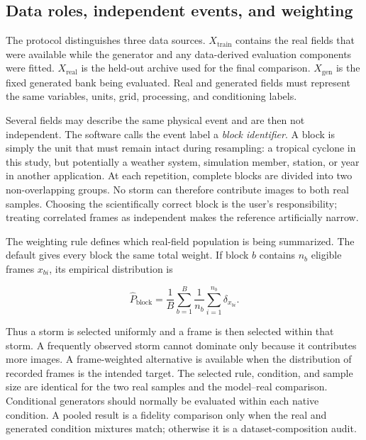 \documentclass[gmd, manuscript]{copernicus}
\begin{document}
\subsection{Data roles, independent events, and weighting}

The protocol distinguishes three data sources. \(X_{\mathrm{train}}\) contains the
real fields that were available while the generator and any data-derived evaluation
components were fitted. \(X_{\mathrm{real}}\) is the held-out archive used for the
final comparison. \(X_{\mathrm{gen}}\) is the fixed generated bank being evaluated.
Real and generated fields must represent the same variables, units, grid, processing,
and conditioning labels.

Several fields may describe the same physical event and are then not independent.
The software calls the event label a \emph{block identifier}. A block is simply the
unit that must remain intact during resampling: a tropical cyclone in this study, but
potentially a weather system, simulation member, station, or year in another
application. At each repetition, complete blocks are divided into two non-overlapping
groups. No storm can therefore contribute images to both real samples. Choosing the
scientifically correct block is the user's responsibility; treating correlated frames
as independent makes the reference artificially narrow.

The weighting rule defines which real-field population is being summarized. The
default gives every block the same total weight. If block \(b\) contains \(n_b\)
eligible frames \(x_{bi}\), its empirical distribution is

\begin{equation}
\widehat{P}_{\mathrm{block}} =
\frac{1}{B}\sum_{b=1}^{B}\frac{1}{n_b}\sum_{i=1}^{n_b}\delta_{x_{bi}} .
\label{eq:blockbalanced}
\end{equation}

Thus a storm is selected uniformly and a frame is then selected within that storm.
A frequently observed storm cannot dominate only because it contributes more
images. A frame-weighted alternative is available when the distribution of recorded
frames is the intended target. The selected rule, condition, and sample size are
identical for the two real samples and the model--real comparison. Conditional
generators should normally be evaluated within each native condition. A pooled result
is a fidelity comparison only when the real and generated condition mixtures match;
otherwise it is a dataset-composition audit.
\end{document}
